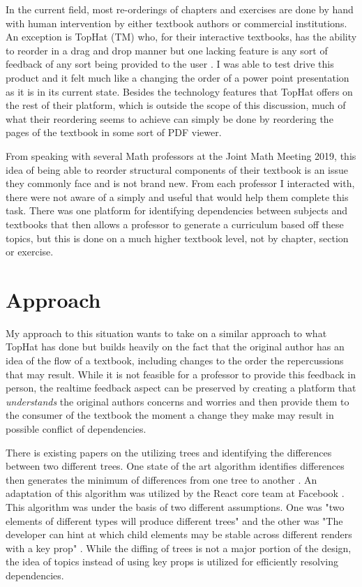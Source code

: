 In the current field, most re-orderings of chapters and exercises are done by hand with human intervention by either textbook authors or commercial institutions. An exception is TopHat (TM) who, for their interactive textbooks, has the ability to reorder in a drag and drop manner but one lacking feature is any sort of feedback of any sort being provided to the user \cite{tophat}. I was able to test drive this product and it felt much like a changing the order of a power point presentation as it is in its current state. Besides the technology features that TopHat offers on the rest of their platform, which is outside the scope of this discussion, much of what their reordering seems to achieve can simply be done by reordering the pages of the textbook in some sort of PDF viewer.

From speaking with several Math professors at the Joint Math Meeting 2019, this idea of being able to reorder structural components of their textbook is an issue they commonly face and is not brand new. From each professor I interacted with, there were not aware of a simply and useful that would help them complete this task. There was one platform for identifying dependencies between subjects and textbooks that then allows a professor to generate a curriculum based off these topics, but this is done on a much higher textbook level, not by chapter, section or exercise.

\section{Approach}

My approach to this situation wants to take on a similar approach to what TopHat has done but builds heavily on the fact that the original author has an idea of the flow of a textbook, including changes to the order the repercussions that may result. While it is not feasible for a professor to provide this feedback in person, the realtime feedback aspect can be preserved by creating a platform that \textit{understands} the original authors concerns and worries and then provide them to the consumer of the textbook the moment a change they make may result in possible conflict of dependencies.

There is existing papers on the utilizing trees and identifying the differences between two different trees. One state of the art algorithm identifies differences then generates the minimum of differences from one tree to another \cite{bile}\cite{tsur}. An adaptation of this algorithm was utilized by the React core team at Facebook \cite{reactReconcile}. This algorithm was under the basis of two different assumptions. One was "two elements of different types will produce different trees" and the other was "The developer can hint at which child elements may be stable across different renders with a key prop" \cite{reactReconcile}. While the diffing of trees is not a major portion of the design, the idea of topics instead of using key props is utilized for efficiently resolving dependencies.
